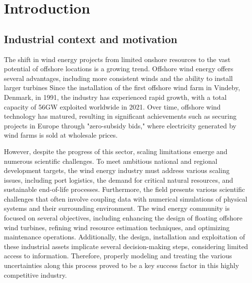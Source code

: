 \chapter*{Introduction}


\section*{Industrial context and motivation}

The shift in wind energy projects from limited onshore resources to the vast potential of offshore locations is a growing trend. 
Offshore wind energy offers several advantages, including more consistent winds and the ability to install larger turbines
Since the installation of the first offshore wind farm in Vindeby, Denmark, in 1991, the industry has experienced rapid growth, with a total capacity of 56GW exploited worldwide in 2021. 
Over time, offshore wind technology has matured, resulting in significant achievements such as securing projects in Europe through "zero-subsidy bids," where electricity generated by wind farms is sold at wholesale prices. 

However, despite the progress of this sector, scaling limitations emerge and numerous scientific challenges.
To meet ambitious national and regional development targets, the wind energy industry must address various scaling issues, including port logistics, the demand for critical natural resources, and sustainable end-of-life processes. 
Furthermore, the field presents various scientific challenges that often involve coupling data with numerical simulations of physical systems and their surrounding environment.
The wind energy community is focused on several objectives, including enhancing the design of floating offshore wind turbines, refining wind resource estimation techniques, and optimizing maintenance operations. 
Additionally, the design, installation and exploitation of these industrial assets implicate several decision-making steps, considering limited access to information.
Therefore, properly modeling and treating the various uncertainties along this process proved to be a key success factor in this highly competitive industry.

